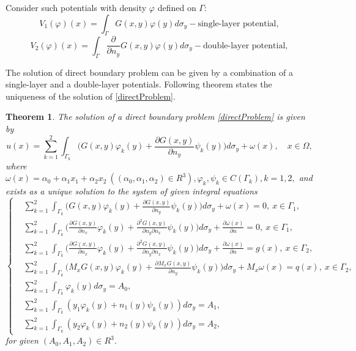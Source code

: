 \documentclass[12pt]{article}
\newtheorem{theorem}{Theorem}
\begin{document}
Consider such potentials with density $\varphi$ defined on $\Gamma$:
$$
	V_1(\varphi)(x)=\int_\Gamma G(x,y)\varphi(y)d\sigma_y - \textrm{single-layer potential},
$$ 
$$
	V_2(\varphi)(x)=\int_\Gamma\frac{\partial}{\partial n_y}G(x,y)\varphi(y) d\sigma_y  - \textrm{double-layer potential},
$$

The solution of direct boundary problem can be given by a combination of a single-layer and a double-layer potentials. Following theorem states the uniqueness of the solution of \eqref{directProblem}.

\begin{theorem}
 	The solution of a direct boundary problem \eqref{directProblem} is given by
	 \begin{equation}
	 	u(x)=\sum_{k=1}^{2}\int_{\Gamma_k}\bigg(G(x,y)\varphi_k(y)+\frac{\partial G(x,y)}{\partial n_y}\psi_k(y)\bigg)d\sigma_y+\omega(x), \quad x\in \Omega,
	 \end{equation}
	 where $\omega(x) = \alpha_0+\alpha_1x_1+\alpha_2x_2 \ ((\alpha_0,\alpha_1,\alpha_2)\in R^3), \varphi_k,\psi_k\in C(\Gamma_k), k=1,2,$ and exists as a unique solution to the system of given integral equations
	 \begin{equation}
	 \left\{
	 	\begin{split}
		\label{system}
	 		&\sum_{k=1}^{2}\int_{\Gamma_k}\bigg(G(x,y)\varphi_k(y)+\frac{\partial G(x,y)}{\partial n_y}\psi_k(y)\bigg)d\sigma_y+\omega(x)=0, \ x\in\Gamma_1, \\
			&\sum_{k=1}^{2}\int_{\Gamma_k}\bigg(\frac{\partial G(x,y)}{\partial n_x}\varphi_k(y)+\frac{\partial^2 G(x,y)}{\partial n_y\partial n_x}\psi_k(y)\bigg)d\sigma_y+\frac{\partial\omega(x)}{\partial n}=0, \ x\in\Gamma_1, \\
			&\sum_{k=1}^{2}\int_{\Gamma_k}\bigg(\frac{\partial G(x,y)}{\partial n_x}\varphi_k(y)+\frac{\partial^2 G(x,y)}{\partial n_y\partial n_x}\psi_k(y)\bigg)d\sigma_y+\frac{\partial\omega(x)}{\partial n}=g(x), \ x\in\Gamma_2, \\
			&\sum_{k=1}^{2}\int_{\Gamma_k}\bigg(M_x G(x,y)\varphi_k(y)+\frac{\partial M_x G(x,y)}{\partial n_y}\psi_k(y)\bigg)d\sigma_y+M_x\omega(x)=q(x), \ x\in\Gamma_2, \\
			&\sum_{k=1}^{2}\int_{\Gamma_k}\varphi_k(y)d\sigma_y=A_0, \\
			&\sum_{k=1}^{2}\int_{\Gamma_k}(y_1\varphi_k(y)+n_1(y)\psi_k(y))d\sigma_y=A_1, \\
			&\sum_{k=1}^{2}\int_{\Gamma_k}(y_2\varphi_k(y)+n_2(y)\psi_k(y))d\sigma_y=A_2,
		\end{split}
	\right.
	 \end{equation}
	 for given $(A_0,A_1,A_2)\in R^3$.
 \end{theorem}
\end{document}

